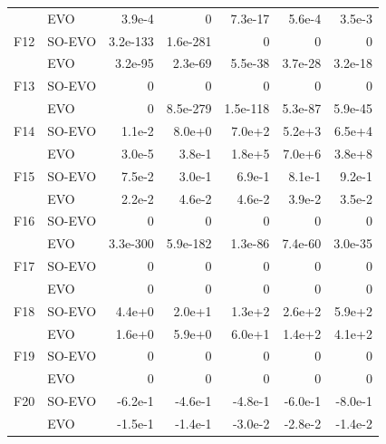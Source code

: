 \begin{table}[htbp]
\begin{tabular}{llrrrrr}
 & EVO & 3.9e{-}4 & 0 & 7.3e{-}17 & 5.6e{-}4 & 3.5e{-}3 \\[2pt]
F12 & SO-EVO & 3.2e{-}133 & 1.6e{-}281 & 0 & 0 & 0 \\
 & EVO & 3.2e{-}95 & 2.3e{-}69 & 5.5e{-}38 & 3.7e{-}28 & 3.2e{-}18 \\[2pt]
F13 & SO-EVO & 0 & 0 & 0 & 0 & 0 \\
 & EVO & 0 & 8.5e{-}279 & 1.5e{-}118 & 5.3e{-}87 & 5.9e{-}45 \\[2pt]
F14 & SO-EVO & 1.1e{-}2 & 8.0e{+}0 & 7.0e{+}2 & 5.2e{+}3 & 6.5e{+}4 \\
 & EVO & 3.0e{-}5 & 3.8e{-}1 & 1.8e{+}5 & 7.0e{+}6 & 3.8e{+}8 \\[2pt]
F15 & SO-EVO & 7.5e{-}2 & 3.0e{-}1 & 6.9e{-}1 & 8.1e{-}1 & 9.2e{-}1 \\
 & EVO & 2.2e{-}2 & 4.6e{-}2 & 4.6e{-}2 & 3.9e{-}2 & 3.5e{-}2 \\[2pt]
F16 & SO-EVO & 0 & 0 & 0 & 0 & 0 \\
 & EVO & 3.3e{-}300 & 5.9e{-}182 & 1.3e{-}86 & 7.4e{-}60 & 3.0e{-}35 \\[2pt]
F17 & SO-EVO & 0 & 0 & 0 & 0 & 0 \\
 & EVO & 0 & 0 & 0 & 0 & 0 \\[2pt]
F18 & SO-EVO & 4.4e{+}0 & 2.0e{+}1 & 1.3e{+}2 & 2.6e{+}2 & 5.9e{+}2 \\
 & EVO & 1.6e{+}0 & 5.9e{+}0 & 6.0e{+}1 & 1.4e{+}2 & 4.1e{+}2 \\[2pt]
F19 & SO-EVO & 0 & 0 & 0 & 0 & 0 \\
 & EVO & 0 & 0 & 0 & 0 & 0 \\[2pt]
F20 & SO-EVO & -6.2e{-}1 & -4.6e{-}1 & -4.8e{-}1 & -6.0e{-}1 & -8.0e{-}1 \\
 & EVO & -1.5e{-}1 & -1.4e{-}1 & -3.0e{-}2 & -2.8e{-}2 & -1.4e{-}2 \\[2pt]
\bottomrule
\end{tabular}
\end{table}
